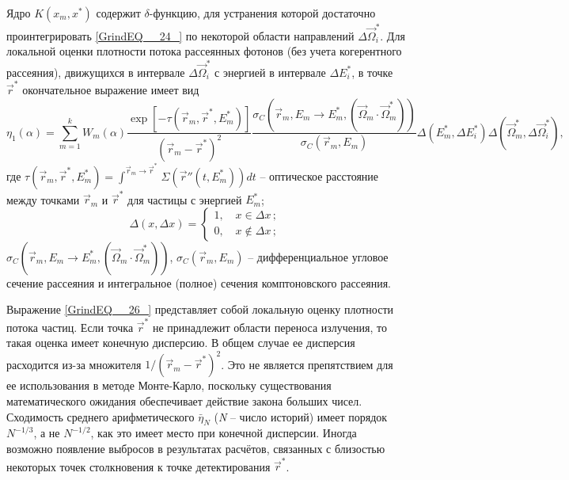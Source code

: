 \documentclass[
11pt,
master, %
subf, %
href, %
colorlinks=true, %
]{disser}
\begin{document}
Ядро $K \left(x_{m} ,x^{*} \right)$ содержит $\delta $-функцию, для устранения которой достаточно проинтегрировать \eqref{GrindEQ__24_} по некоторой области направлений $\Delta \vec{\Omega }_{i}^{*} $. Для локальной оценки плотности потока рассеянных фотонов (без учета когерентного рассеяния), движущихся в интервале $\Delta \vec{\Omega }_{i}^{*} $ с энергией в интервале $\Delta E_{i}^{*} $, в точке $\vec{r}^{*} $ окончательное выражение имеет вид
\begin{equation} \label{GrindEQ__26_}
\eta _{1} (\alpha )=\sum _{m=1}^{k}W_{m}  (\alpha )\frac{\exp \left[-\tau \left(\vec{r}_{m} ,\vec{r}^{*} ,E_{m}^{*} \right)\right]}{\left(\vec{r}_{m} -\vec{r}^{*} \right)^{2} } \frac{\sigma _{C} \left(\vec{r}_{m} ,E_{m} \to E_{m}^{*} ,\left(\vec{\Omega }_{m} \cdot \vec{\Omega }_{m}^{*} \right)\right)}{\sigma _{C} \left(\vec{r}_{m} ,E_{m} \right)} \Delta \left(E_{m}^{*} ,\Delta E_{i}^{*} \right)\Delta \left(\vec{\Omega }_{m}^{*} ,\Delta \vec{\Omega }_{i}^{*} \right),
\end{equation}
где $\tau \left(\vec{r}_{m} ,\vec{r}^{*} ,E_{m}^{*} \right)=\int _{\, }^{\vec{r}_{m} \to \vec{r}^{*} \, }\Sigma \left(\vec{r}''\left(t ,E_{m}^{*} \right) \right)dt$ -- оптическое расстояние между точками $\vec{r}_{m} $ и $\vec{r}^{*} $ для частицы с энергией $E_{m}^{*} $;
\[\Delta (x,\Delta x)=\left\{\begin{array}{l} {1,\quad x\in \Delta x\, ;} \\ {0,\quad x\notin \Delta x\, ;} \end{array}\right. \]
$\sigma _{C} \left(\vec{r}_{m} ,E_{m} \to E_{m}^{*} , \left(\vec{\Omega }_{m} \cdot \vec{\Omega }_{m}^{*} \right) \right)$, $\sigma _{C} \left(\vec{r}_{m} ,E_{m} \right)$ -- дифференциальное угловое сечение рассеяния и интегральное (полное) сечения комптоновского рассеяния.

Выражение \eqref{GrindEQ__26_} представляет собой локальную оценку плотности потока частиц. Если точка $\vec{r}^{*} $ не принадлежит области переноса излучения, то такая оценка имеет конечную дисперсию. В общем случае ее дисперсия расходится из-за множителя $1/\left(\vec{r}_{m} -\vec{r}^{*} \right)^{2} $. Это не является препятствием для ее использования в методе Монте-Карло, поскольку существования математического ожидания обеспечивает действие закона больших чисел. Сходимость среднего арифметического $\bar{\eta }_{N} $ (\textit{N} -- число историй) имеет порядок $N^{-1/3} $, а не $N^{-1/2} $, как это имеет место при конечной дисперсии. Иногда возможно появление выбросов в результатах расчётов, связанных с близостью некоторых точек столкновения к точке детектирования $\vec{r}^{*} $.
\end{document}
